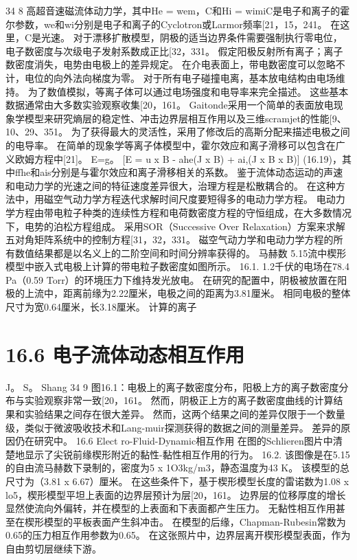 \documentclass[UTF8,11pt,a4paper,openany,fontset=fandol]{ctexbook}
\begin{document}
34 8 高超音速磁流体动力学，其中He = wem，C和Hi = wimiC是电子和离子的霍尔参数，we和wi分别是电子和离子的Cyclotron或Larmor频率[21，15，241。 在这里，C是光速。 对于漂移扩散模型，阴极的适当边界条件需要强制执行零电位，电子数密度与次级电子发射系数成正比[32，331。 假定阳极反射所有离子；离子数密度消失，电势由电极上的差异规定。 在介电表面上，带电数密度可以忽略不计，电位的向外法向梯度为零。 对于所有电子碰撞电离，基本放电结构由电场维持。 为了数值模拟，等离子体可以通过电场强度和电导率来完全描述。 这些基本数据通常由大多数实验观察收集[20，161。 Gaitonde采用一个简单的表面放电现象学模型来研究熵层的稳定性、冲击边界层相互作用以及三维scramjet的性能[9、10、29、351。 为了获得最大的灵活性，采用了修改后的高斯分配来描述电极之间的电导率。 在简单的现象学等离子体模型中，霍尔效应和离子滑移可以包含在广义欧姆方程中[21]。 E=g。 [E = u x B - ahe(J x B) + ai,(J x B x B)] (16.19)，其中ffhe和ais分别是与霍尔效应和离子滑移相关的系数。 鉴于流体动态运动的声速和电动力学的光速之间的特征速度差异很大，治理方程是松散耦合的。 在这种方法中，用磁空气动力学方程迭代求解时间尺度要短得多的电动力学方程。 电动力学方程由带电粒子种类的连续性方程和电荷数密度方程的守恒组成，在大多数情况下，电势的泊松方程组成。 采用SOR（Successive Over Relaxation）方案来求解五对角矩阵系统中的控制方程[31，32，331。 磁空气动力学和电动力学方程的所有数值结果都是以名义上的二阶空间和时间分辨率获得的。 马赫数 5.15流中楔形模型中嵌入式电极上计算的带电粒子数密度如图所示。 16.1. 1.2千伏的电场在78.4 Pa（0.59 Torr）的环境压力下维持发光放电。 在研究的配置中，阴极被放置在阳极的上流中，距离前缘为2.22厘米，电极之间的距离为3.81厘米。 相同电极的整体尺寸为宽0.64厘米，长3.18厘米。 计算的离子

\section{16.6 电子流体动态相互作用}
J。 S。 Shang 34 9 图16.1：电极上的离子数密度分布，阳极上方的离子数密度分布与实验观察非常一致[20，161。 然而，阴极正上方的离子数密度曲线的计算结果和实验结果之间存在很大差异。 然而，这两个结果之间的差异仅限于一个数量级，类似于微波吸收技术和Lang-muir探测获得的数据之间的测量差异。 差异的原因仍在研究中。 16.6 Elect ro-Fluid-Dynamic相互作用 在图的Schlieren图片中清楚地显示了尖锐前缘楔形附近的黏性-黏性相互作用的行为。 16.2. 该图像是在5.15的自由流马赫数下录制的，密度为5 x 1O3kg/m3，静态温度为43 K。 该模型的总尺寸为（3.81 x 6.67）厘米。 在这些条件下，基于楔形模型长度的雷诺数为1.08 x lo5，楔形模型平坦上表面的边界层预计为层[20，161。 边界层的位移厚度的增长显然使流向外偏转，并在模型的上表面和下表面都产生压力。 无黏性相互作用甚至在楔形模型的平板表面产生斜冲击。 在模型的后缘，Chapman-Rubesin常数为0.65的压力相互作用参数为0.65。 在这张照片中，边界层离开楔形模型表面，作为自由剪切层继续下游。
\end{document}
